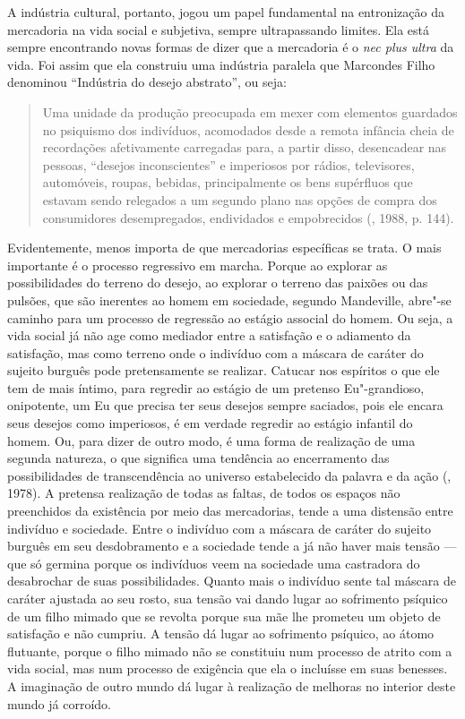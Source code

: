 A indústria cultural, portanto, jogou um papel fundamental na
entronização da mercadoria na vida social e subjetiva, sempre
ultrapassando limites. Ela está sempre encontrando novas formas de dizer
que a mercadoria é o \emph{nec plus ultra} da vida. Foi assim que ela
construiu uma indústria paralela que Marcondes Filho denominou
``Indústria do desejo abstrato'', ou seja:

\begin{quote}
Uma unidade da produção preocupada em mexer com elementos guardados no
psiquismo dos indivíduos, acomodados desde a remota infância cheia de
recordações afetivamente carregadas para, a partir disso, desencadear
nas pessoas, ``desejos inconscientes'' e imperiosos por rádios,
televisores, automóveis, roupas, bebidas, principalmente os bens
supérfluos que estavam sendo relegados a um segundo plano nas opções de
compra dos consumidores desempregados, endividados e empobrecidos
(, 1988, p. 144).
\end{quote}

Evidentemente, menos importa de que mercadorias específicas se trata. O
mais importante é o processo regressivo em marcha. Porque ao explorar as
possibilidades do terreno do desejo, ao explorar o terreno das paixões
ou das pulsões, que são inerentes ao homem em sociedade, segundo
Mandeville, abre"-se caminho para um processo de regressão ao estágio associal do
homem. Ou seja, a vida social já não age como mediador entre a
satisfação e o adiamento da satisfação, mas como terreno onde o
indivíduo com a máscara de caráter do sujeito burguês pode pretensamente
se realizar. Catucar nos espíritos o que ele tem de mais íntimo, para
regredir ao estágio de um pretenso Eu"-grandioso, onipotente, um Eu que
precisa ter seus desejos sempre saciados, pois ele encara seus desejos
como imperiosos, é em verdade regredir ao estágio infantil do homem. Ou,
para dizer de outro modo, é uma forma de realização de uma segunda
natureza, o que significa uma tendência ao encerramento das
possibilidades de transcendência ao universo estabelecido da palavra e
da ação (, 1978). A pretensa realização de todas as faltas, de
todos os espaços não preenchidos da existência por meio das mercadorias,
tende a uma distensão entre indivíduo e sociedade. Entre o indivíduo com
a máscara de caráter do sujeito burguês em seu desdobramento e a
sociedade tende a já não haver mais tensão --- que só germina porque os
indivíduos veem na sociedade uma castradora do desabrochar de suas
possibilidades. Quanto mais o indivíduo sente tal máscara de caráter
ajustada ao seu rosto, sua tensão vai dando lugar ao sofrimento psíquico
de um filho mimado que se revolta porque sua mãe lhe prometeu um objeto
de satisfação e não cumpriu. A tensão dá lugar ao sofrimento psíquico,
ao átomo flutuante, porque o filho mimado não se constituiu num processo
de atrito com a vida social, mas num processo de exigência que ela o
incluísse em suas benesses. A imaginação de outro mundo dá lugar à
realização de melhoras no interior deste mundo já corroído.

